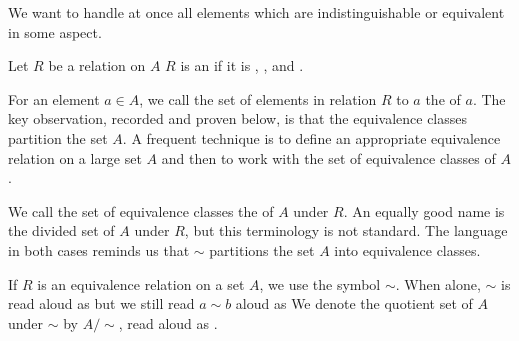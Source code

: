 
\sbasic





\sstart



We want to handle at once all elements which are indistinguishable or equivalent in some aspect.


Let $R$ be a relation on $A$
$R$ is an  if
it is , ,
and .

For an element $a \in A$, we call the set of elements in relation
$R$ to $a$ the  of $a$.
The key observation, recorded and proven below, is that the
equivalence classes partition the set $A$.
A frequent technique is to define an appropriate equivalence
relation on a large set $A$ and then to work with the set of
equivalence classes of $A$.

We call the set of equivalence classes the 
of $A$ under $R$.
An equally good name is the divided set of $A$ under $R$, but this
terminology is not standard.
The language in both cases reminds us that $\sim$ partitions the set
$A$ into equivalence classes.

If $R$ is an equivalence relation on a set $A$,
we use the symbol $\sim$.
When alone, $\sim$ is read aloud as  but we still
read $a \sim b$ aloud as 
We denote the quotient set of $A$ under $\sim$ by $A/\sim$,
read aloud as .


\strats
